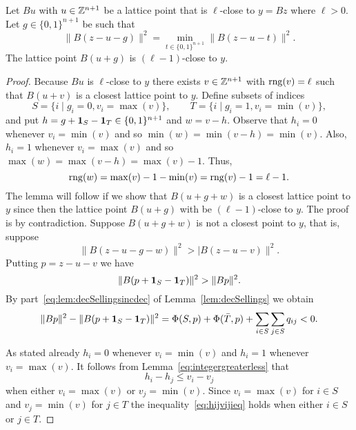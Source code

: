 \documentclass[final,leqno]{siamltex}
\begin{document}
\begin{lemma}\label{lem:rngdecreases}
Let $Bu$ with $u \in {\mathbb Z}^{n+1}$ be a lattice point that is $\ell$-close to $y = Bz$ where $\ell > 0$.  Let $g \in \{0,1\}^{n+1}$ be such that
\begin{equation}\label{eq:qismin}
\|B(z - u - g)\|^2 = \min_{t \in \{0,1\}^{n+1}}\|B(z - u - t)\|^2.
\end{equation}
The lattice point $B(u+g)$ is $(\ell-1)$-close to $y$.
\end{lemma}
\begin{proof}
Because $Bu$ is $\ell$-close to $y$ there exists $v \in {\mathbb Z}^{n+1}$ with $\operatorname{rng}(v) = \ell$ such that $B(u+v)$ is a closest lattice point to $y$.  Define subsets of indices
\[
S = \{i \mid g_i = 0, v_i = \max(v) \}, \qquad T = \{i \mid g_i = 1, v_i = \min(v) \}, 
\]
and put $h = g + \boldsymbol{1}_S - \boldsymbol{1}_T \in \{0,1\}^{n+1}$ and $w = v - h$.  Observe that $h_i = 0$ whenever $v_i = \min(v)$ and so $\min(w) = \min(v-h) = \min(v)$.  Also, $h_i = 1$ whenever $v_i = \max(v)$ and so $\max(w) = \max(v-h) = \max(v) - 1$.  Thus,
\[
\operatorname{rng}(w) = \max(v) - 1 - \min(v) = \operatorname{rng}(v) - 1 = \ell - 1.
\]
The lemma will follow if we show that $B(u+g+w)$ is a closest lattice point to $y$ since then the lattice point $B(u+g)$ with be $(\ell-1)$-close to $y$.  The proof is by contradiction.  Suppose $B(u+g+w)$ is not a closest point to $y$, that is, suppose
\[
\|B(z-u-g-w)\|^2 > |B(z-u-v)\|^2.
\]
Putting $p = z-u-v$ we have
\[
\|B(p+\boldsymbol{1}_S-\boldsymbol{1}_T)\|^2 > \|Bp\|^2.
\]
By part~\ref{eq:lem:decSellingsincdec} of Lemma~\ref{lem:decSellings} we obtain
\begin{equation}\label{eq:BpBpdecincineq}
\|Bp\|^2 - \|B(p+\onebf_S-\onebf_T)\|^2 = \Phi(S,p) + \Phi(\bar{T}, p) + \sum_{i\in S}\sum_{j \in S} q_{ij} < 0.
\end{equation}

As stated already $h_i = 0$ whenever $v_i = \min(v)$ and $h_i = 1$ whenever $v_i = \max(v)$.  It follows from Lemma~\ref{eq:integergreaterless} that
\begin{equation}\label{eq:hijvijieq}
h_{i} - h_j \leq v_{i} - v_j
\end{equation}
when either $v_i = \max(v)$ or $v_j = \min(v)$.  Since $v_i = \max(v)$ for $i \in S$ and $v_j = \min(v)$ for $j \in T$ the inequality~\eqref{eq:hijvijieq} holds when either $i \in S$ or $j \in T$.


\end{proof}
\end{document}
